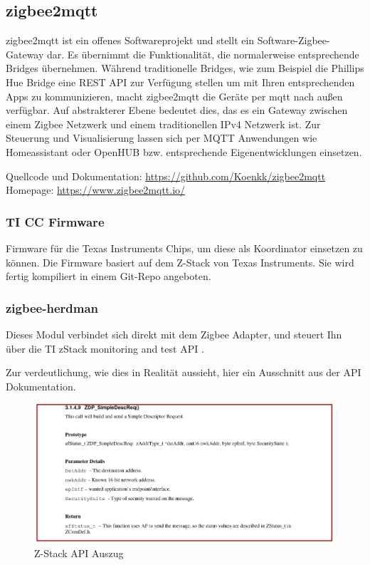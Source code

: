 \subsection{zigbee2mqtt}

zigbee2mqtt ist ein offenes Softwareprojekt und stellt ein \grqq Software-Zigbee-Gateway \grqq dar. Es übernimmt die Funktionalität, die normalerweise entsprechende
\grqq Bridges \grqq übernehmen. Während traditionelle Bridges, wie zum Beispiel die Phillips Hue Bridge eine REST API zur Verfügung stellen um mit Ihren entsprechenden
Apps zu kommunizieren, macht zigbee2mqtt die Geräte per mqtt nach außen verfügbar. Auf abstrakterer Ebene bedeutet dies, das es ein Gateway zwischen einem Zigbee Netzwerk und
einem traditionellen IPv4 Netzwerk ist. Zur Steuerung und Visualisierung lassen sich per MQTT Anwendungen wie \grqq Homeassistant \grqq oder \grqq OpenHUB \grqq{} bzw. entsprechende
Eigenentwicklungen einsetzen.

Quellcode und Dokumentation: \url{https://github.com/Koenkk/zigbee2mqtt}
Homepage: \url{https://www.zigbee2mqtt.io/}

\subsubsection{TI CC Firmware}

Firmware für die Texas Instruments Chips, um diese als Koordinator einsetzen zu können. Die Firmware basiert auf dem Z-Stack von Texas Instruments. Sie wird fertig kompiliert
in einem Git-Repo angeboten. 

\subsubsection{zigbee-herdman}

Dieses Modul verbindet sich direkt mit dem Zigbee Adapter, und steuert Ihn über die \grqq TI zStack monitoring and test API \grqq{}. \cite{zstack}

Zur verdeutlichung, wie dies in Realität aussieht, hier ein Ausschnitt aus der API Dokumentation.

\begin{figure}[H]
  \centering
  \includegraphics[width=1\textwidth]{media/z-stack-api-excerpt.png}
  \caption{Z-Stack API Auszug}
\end{figure}

